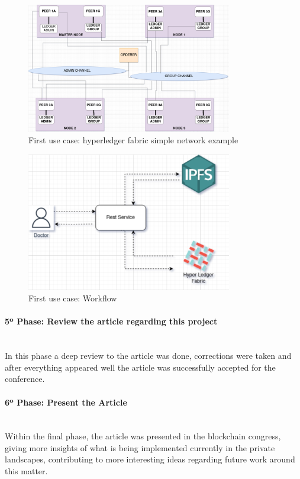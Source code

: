 \begin{figure}[H]
    \centering
    \includegraphics[width=0.8\textwidth]{assets/use-case-1/hyper-ledger-view.drawio.png} %
    \caption{First use case: hyperledger fabric simple network example}
    \label{fig:sample-image} 
\end{figure}

\begin{figure}[H]
    \centering
    \includegraphics[width=0.8\textwidth]{assets/use-case-1/workflow.png} %
    \caption{First use case: Workflow}
    \label{fig:sample-image} 
\end{figure}


\paragraph{5º Phase: Review the article regarding this project}\mbox{}\\
In this phase a deep review to the article was done, corrections were taken and after everything appeared well the article was successfully accepted for the conference.

\paragraph{6º Phase: Present the Article}\mbox{}\\
Within the final phase, the article was presented in the blockchain congress, giving more insights of what is being implemented currently in the private landscapes, contributing to more interesting ideas regarding future work around this matter. 

